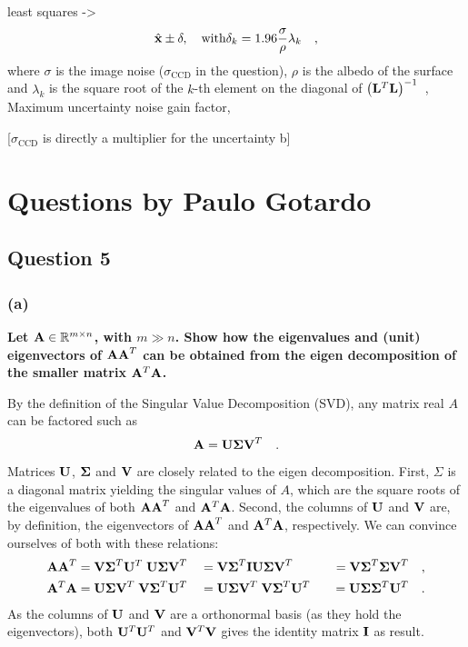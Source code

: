 \documentclass{report}
\begin{document}
least squares ->
\begin{equation}
\hat{\mathbf{x}} \pm \mathbf{\delta} , \quad \text{with} \delta_k = 1.96\frac{\sigma}{\rho}\lambda_k
\quad,
\end{equation}
where $\sigma$ is the image noise ($\sigma_\text{CCD}$ in the question), $\rho$ is the albedo of the surface and $\lambda_k$ is the square root of the $k$-th element on the diagonal of $\left(\mathbf{L}^T\mathbf{L}\right)^{-1}$~\cite{Hastie-09},
Maximum uncertainty noise gain factor, \cite{holdgeoffroy-3dv-15}

[$\sigma_\text{CCD}$ is directly a multiplier for the uncertainty b]

\chapter{Questions by Paulo Gotardo}

\section{Question 5}
\subsection{(a)}
\textbf{Let $\mathbf{A} \in \mathbb{R}^{m \times n}$, with $m \gg n$. Show how the eigenvalues and (unit) eigenvectors of $\mathbf{AA}^T$ can be obtained from the eigen decomposition of the smaller matrix $\mathbf{A}^T\mathbf{A}$.}

By the definition of the Singular Value Decomposition (SVD), any matrix real $A$ can be factored such as
\begin{equation}
\mathbf{A} = \mathbf{U \Sigma V}^T \quad.
\end{equation}
Matrices $\mathbf{U}$, $\mathbf{\Sigma}$ and $\mathbf{V}$ are closely related to the eigen decomposition. First, $\Sigma$ is a diagonal matrix yielding the singular values of $A$, which are the square roots of the eigenvalues of both $\mathbf{AA}^T$ and $\mathbf{A}^T\mathbf{A}$. Second, the columns of $\mathbf{U}$ and $\mathbf{V}$ are, by definition, the eigenvectors of $\mathbf{AA}^T$ and $\mathbf{A}^T\mathbf{A}$, respectively. We can convince ourselves of both with these relations:
\begin{align*}
\mathbf{AA}^T           &= \mathbf{V\Sigma}^T\mathbf{U}^T \; \mathbf{U\Sigma V}^T
                        &&= \mathbf{V\Sigma}^T\mathbf{IU\Sigma V}^T 
                        &&&= \mathbf{V\Sigma}^T\mathbf{\Sigma V}^T \quad,\\
\mathbf{A}^T\mathbf{A}  &= \mathbf{U\Sigma V}^T \; \mathbf{V\Sigma}^T\mathbf{U}^T
                        &&= \mathbf{U\Sigma V}^T \; \mathbf{V\Sigma}^T\mathbf{U}^T
                        &&&= \mathbf{U\Sigma}\mathbf{\Sigma}^T\mathbf{U}^T \quad.
\end{align*}
As the columns of $\mathbf{U}$ and $\mathbf{V}$ are a orthonormal basis (as they hold the eigenvectors), both $\mathbf{U}^T\mathbf{U}^T$ and $\mathbf{V}^T\mathbf{V}$ gives the identity matrix $\mathbf{I}$ as result.
\end{document}
